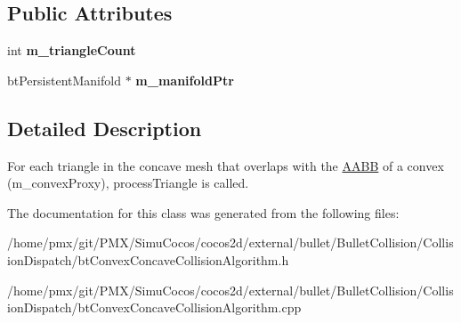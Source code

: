 \subsection*{Public Attributes}
\begin{DoxyCompactItemize}
\item 
\mbox{\label{classbtConvexTriangleCallback_aeb7c14e970b2fc734f02787497f7b9b9}} 
int {\bfseries m\+\_\+triangle\+Count}
\item 
\mbox{\label{classbtConvexTriangleCallback_af0dd0d3172324cfab3d5d93b05c1a576}} 
bt\+Persistent\+Manifold $\ast$ {\bfseries m\+\_\+manifold\+Ptr}
\end{DoxyCompactItemize}


\subsection{Detailed Description}
For each triangle in the concave mesh that overlaps with the \hyperlink{classAABB}{A\+A\+BB} of a convex (m\+\_\+convex\+Proxy), process\+Triangle is called. 

The documentation for this class was generated from the following files\+:\begin{DoxyCompactItemize}
\item 
/home/pmx/git/\+P\+M\+X/\+Simu\+Cocos/cocos2d/external/bullet/\+Bullet\+Collision/\+Collision\+Dispatch/bt\+Convex\+Concave\+Collision\+Algorithm.\+h\item 
/home/pmx/git/\+P\+M\+X/\+Simu\+Cocos/cocos2d/external/bullet/\+Bullet\+Collision/\+Collision\+Dispatch/bt\+Convex\+Concave\+Collision\+Algorithm.\+cpp\end{DoxyCompactItemize}
